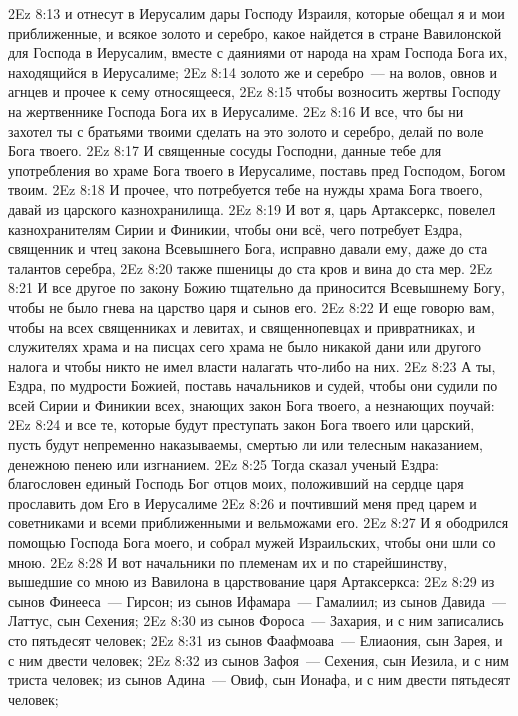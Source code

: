 \vs 2Ez 8:13 и отнесут в Иерусалим дары Господу Израиля, которые обещал я и мои приближенные, и всякое золото и серебро, какое найдется в стране Вавилонской для Господа в Иерусалим, вместе с даяниями от народа на храм Господа Бога их, находящийся в Иерусалиме;
\vs 2Ez 8:14 золото же и серебро~--- на волов, овнов и агнцев и прочее к сему относящееся,
\vs 2Ez 8:15 чтобы возносить жертвы Господу на жертвеннике Господа Бога их в Иерусалиме.
\vs 2Ez 8:16 И все, что бы ни захотел ты с братьями твоими сделать на это золото и серебро, делай по воле Бога твоего.
\vs 2Ez 8:17 И священные сосуды Господни, данные тебе для употребления во храме Бога твоего в Иерусалиме, поставь пред Господом, Богом твоим.
\vs 2Ez 8:18 И прочее, что потребуется тебе на нужды храма Бога твоего, давай из царского казнохранилища.
\vs 2Ez 8:19 И вот я, царь Артаксеркс, повелел казнохранителям Сирии и Финикии, чтобы они всё, чего потребует Ездра, священник и чтец закона Всевышнего Бога, исправно давали ему, даже до ста талантов серебра,
\vs 2Ez 8:20 также пшеницы до ста кров и вина до ста мер.
\vs 2Ez 8:21 И все другое по закону Божию тщательно да приносится Всевышнему Богу, чтобы не было гнева на царство царя и сынов его.
\vs 2Ez 8:22 И еще говорю вам, чтобы на всех священниках и левитах, и священнопевцах и привратниках, и служителях храма и на писцах сего храма не было никакой дани или другого налога и чтобы никто не имел власти налагать что-либо на них.
\vs 2Ez 8:23 А ты, Ездра, по мудрости Божией, поставь начальников и судей, чтобы они судили по всей Сирии и Финикии всех, знающих закон Бога твоего, а незнающих поучай:
\vs 2Ez 8:24 и все те, которые будут преступать закон Бога твоего или царский, пусть будут непременно наказываемы, смертью ли или телесным наказанием, денежною пенею или изгнанием.
\rsbpar\vs 2Ez 8:25 Тогда сказал ученый Ездра: благословен единый Господь Бог отцов моих, положивший на сердце царя прославить дом Его в Иерусалиме
\vs 2Ez 8:26 и почтивший меня пред царем и советниками и всеми приближенными и вельможами его.
\vs 2Ez 8:27 И я ободрился помощью Господа Бога моего, и собрал мужей Израильских, чтобы они шли со мною.
\rsbpar\vs 2Ez 8:28 И вот начальники по племенам их и по старейшинству, вышедшие со мною из Вавилона в царствование царя Артаксеркса:
\vs 2Ez 8:29 из сынов Финееса~--- Гирсон; из сынов Ифамара~--- Гамалиил; из сынов Давида~--- Латтус, сын Сехения;
\vs 2Ez 8:30 из сынов Фороса~--- Захария, и с ним записались сто пятьдесят человек;
\vs 2Ez 8:31 из сынов Фаафмоава~--- Елиаония, сын Зарея, и с ним двести человек;
\vs 2Ez 8:32 из сынов Зафоя~--- Сехения, сын Иезила, и с ним триста человек; из сынов Адина~--- Овиф, сын Ионафа, и с ним двести пятьдесят человек;
